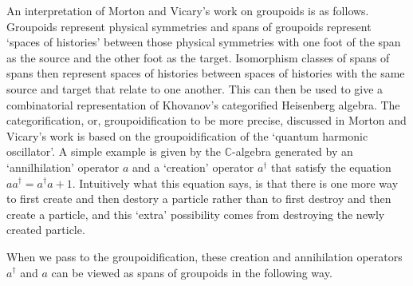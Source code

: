 \documentclass[11pt]{amsart}
\theoremstyle{remark}
\theoremstyle{definition}
\begin{document}
An interpretation of Morton and Vicary's \cite{MortVic} work on groupoids is as follows. Groupoids represent physical symmetries and spans of groupoids represent `spaces of histories' between those physical symmetries with one foot of the span as the source and the other foot as the target. Isomorphism classes of spans of spans then represent spaces of histories between spaces of histories with the same source and target that relate to one another. This can then be used to give a combinatorial representation of Khovanov's categorified Heisenberg algebra. The categorification, or, groupoidification to be more precise, discussed in Morton and Vicary's work is based on the groupoidification of the `quantum harmonic oscillator'. A simple example is given by the $\mathbb{C}$-algebra generated by an `annilhilation' operator $a$ and a `creation' operator $a^\dagger$ that satisfy the equation $aa^\dagger=a^\dagger a+1$. Intuitively what this equation says, is that there is one more way to first create and then destory a particle rather than to first destroy and then create a particle, and this `extra' possibility comes from destroying the newly created particle.

When we pass to the groupoidification, these creation and annihilation operators $a^\dagger$ and $a$ can be viewed as spans of groupoids in the following way.
\end{document}
